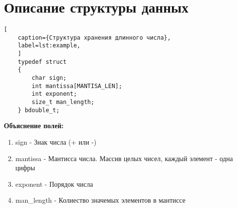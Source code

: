 \chapter{Описание структуры данных}

\begin{lstlisting}[
	caption={Структура хранения длинного числа},
	label=lst:example,
	]
	typedef struct 
	{
		char sign;     
		int mantissa[MANTISA_LEN];
		int exponent;         
		size_t man_length; 
	} bdouble_t;
\end{lstlisting}
\textbf{Объяснение полей:}
\begin{enumerate}
	\item sign - Знак числа (+ или -)
	\item mantissa - Мантисса числа. Массив целых чисел, каждый элемент - одна цифры
	\item exponent - Порядок числа
	\item man\_length - Колиество значемых элементов в мантиссе
\end{enumerate}

